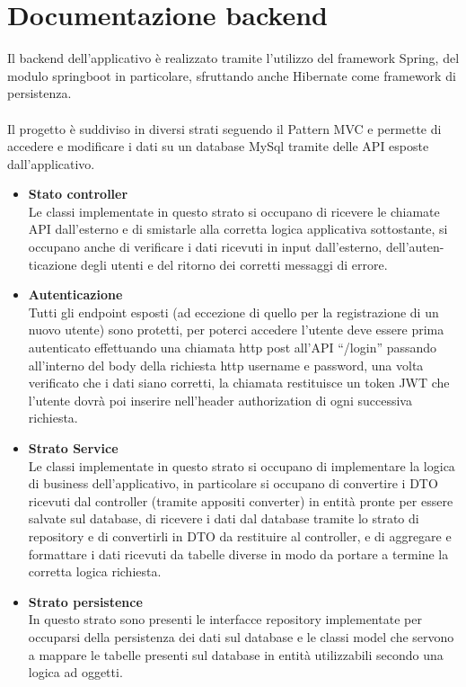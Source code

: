 \documentclass{article}
\begin{document}
\section{Documentazione backend}
Il backend dell’applicativo è realizzato tramite l’utilizzo del framework Spring, del modulo springboot in particolare, sfruttando anche Hibernate come framework di persistenza.\\
\\
Il progetto è suddiviso in diversi strati seguendo il Pattern MVC e permette di accedere e modificare i dati su un database MySql tramite delle API esposte dall’applicativo.\\
\begin{itemize}
\item \textbf{Stato controller}\\
Le classi implementate in questo strato si occupano di ricevere le chiamate API dall’esterno e di smistarle alla corretta logica applicativa sottostante, si occupano anche di verificare i dati ricevuti in input dall’esterno, dell’auten-ticazione degli utenti e del ritorno dei corretti messaggi di errore.
\item \textbf{Autenticazione}\\
Tutti gli endpoint esposti (ad eccezione di quello per la registrazione di un nuovo utente) sono protetti, per poterci accedere l’utente deve essere prima autenticato effettuando una chiamata http post all’API “/login” passando all’interno del body della richiesta http username e password, una volta verificato che i dati siano corretti, la chiamata restituisce un token JWT che l’utente dovrà poi inserire nell’header authorization di ogni successiva richiesta.
\item \textbf{Strato Service}\\
Le classi implementate in questo strato si occupano di implementare la logica di business dell’applicativo, in particolare si occupano di convertire i DTO ricevuti dal controller (tramite appositi converter) in entità pronte per essere salvate sul database, di ricevere i dati dal database tramite lo strato di repository e di convertirli in DTO da restituire al controller, e di aggregare e formattare i dati ricevuti da tabelle diverse in modo da portare a termine la corretta logica richiesta.
\item \textbf{Strato persistence}\\
In questo strato sono presenti le interfacce repository implementate per occuparsi della persistenza dei dati sul database e le classi model che servono a mappare le tabelle presenti sul database in entità utilizzabili secondo una logica ad oggetti.
\end{itemize}
\clearpage
\end{document}
